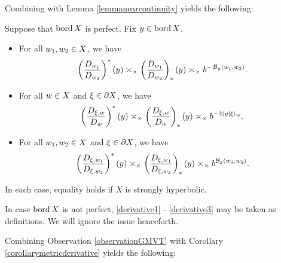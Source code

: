 Combining with Lemma \ref{lemmanearcontinuity} yields the following:

\begin{corollary}
\label{corollarymetricderivative}
Suppose that $\operatorname{bord} X$ is perfect. Fix $y\in\operatorname{bord} X$.
\begin{itemize}
\item[(i)] For all $w_1,w_2\in X$, we have
\begin{equation}
\label{derivative1}
\left(\frac{D_{w_1}}{D_{w_2}}\right)^*(y) \asymp_\times \left(\frac{D_{w_1}}{D_{w_2}}\right)_*(y) \asymp_\times b^{-\operatorname{\mathcal B}_y(w_1,w_2)}.
\end{equation}
\item[(ii)] For all $w\in X$ and $\xi\in\partial X$, we have
\begin{equation}
\label{derivative2}
\left(\frac{D_{\xi,w}}{D_w}\right)^*(y) \asymp_\times \left(\frac{D_{\xi,w}}{D_w}\right)_*(y) \asymp_\times b^{-2\langle y|\xi\rangle_w}.
\end{equation}
\item[(iii)] For all $w_1,w_2\in X$ and $\xi\in\partial X$, we have
\begin{equation}
\label{derivative3}
\left(\frac{D_{\xi,w_1}}{D_{\xi,w_2}}\right)^*(y) \asymp_\times \left(\frac{D_{\xi,w_1}}{D_{\xi,w_2}}\right)_*(y) \asymp_\times b^{\operatorname{\mathcal B}_\xi(w_1,w_2)}.
\end{equation}
\end{itemize}
In each case, equality holds if $X$ is strongly hyperbolic.
\end{corollary}
\begin{remark}
In case $\operatorname{bord} X$ is not perfect, \eqref{derivative1} - \eqref{derivative3} may be taken as definitions. We will ignore the issue henceforth.
\end{remark}
Combining Observation \ref{observationGMVT} with Corollary \ref{corollarymetricderivative} yields the following:
